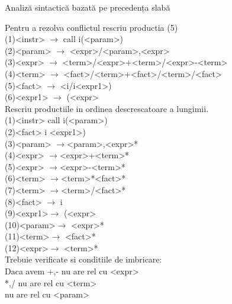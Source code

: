 \documentclass[pdf]{beamer}
\begin{document}
\begin{frame}{Analiză sintactică bazată pe precedența slabă}
\vspace{2mm}
\tiny

\tiny
Pentru a rezolva conflictul rescriu productia (5)\\
(1)<instr> $\rightarrow$ call i(<param>)\\
(2)<param> $\rightarrow$ <expr>/<param>,<expr>\\
(3)<expr>  $\rightarrow$ <term>/<expr>+<term>/<expr>-<term>\\
(4)<term>  $\rightarrow$ <fact>/<term>+<fact>/<term>/<fact>\\
(5)<fact>  $\rightarrow$ <i/i<expr1>)\\
(6)<expr1> $\rightarrow$ (<expr>\\


Rescriu productiile in ordinea descrescatoare a lungimii.\\
(1)<instr> call i(<param>)\\
(2)<fact> i <expr1>)\\
(3)<param>{ $\rightarrow$}<param>,<expr>*\\
(4)<expr> $\rightarrow$<expr>+<term>*\\
(5)<expr> $\rightarrow$<expr>-<term>*\\
(6)<term> $\rightarrow$<term>*<fact>*\\
(7)<term> $\rightarrow$<term>/<fact>*\\
(8)<fact> $\rightarrow$ i\\
(9)<expr1>$\rightarrow$ (<expr>\\
(10)<param>$\rightarrow$ <expr>*\\
(11)<term>$\rightarrow$ <fact>*\\
(12)<expr>$\rightarrow$ <term>*\\

Trebuie verificate si conditiile de imbricare:\\
Daca avem 
+,- nu are rel cu <expr>\\
*,/ nu are rel cu <term>\\
nu are rel cu <param>\\
\end{frame}
\end{document}
